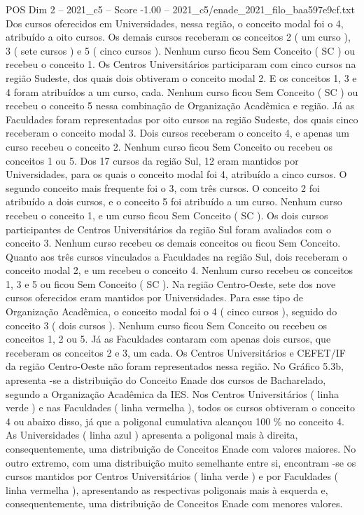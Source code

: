 \begin{textsample}{POS Dim 2 – 2021\_c5 – Score -1.00 – 2021\_c5/enade\_2021\_filo\_baa597e9cf.txt}
Dos cursos oferecidos em Universidades, nessa região, o conceito modal foi o 4, atribuído a oito cursos.
Os demais cursos receberam os conceitos 2 ( um curso ), 3 ( sete cursos ) e 5 ( cinco cursos ).
Nenhum curso ficou Sem Conceito ( SC ) ou recebeu o conceito 1.
Os Centros Universitários participaram com cinco cursos na região Sudeste, dos quais dois obtiveram o conceito modal 2.
E os conceitos 1, 3 e 4 foram atribuídos a um curso, cada.
Nenhum curso ficou Sem Conceito ( SC ) ou recebeu o conceito 5 nessa combinação de Organização Acadêmica e região.
Já as Faculdades foram representadas por oito cursos na região Sudeste, dos quais cinco receberam o conceito modal 3.
Dois cursos receberam o conceito 4, e apenas um curso recebeu o conceito 2.
Nenhum curso ficou Sem Conceito ou recebeu os conceitos 1 ou 5.
Dos 17 cursos da região Sul, 12 eram mantidos por Universidades, para os quais o conceito modal foi 4, atribuído a cinco cursos.
O segundo conceito mais frequente foi o 3, com três cursos.
O conceito 2 foi atribuído a dois cursos, e o conceito 5 foi atribuído a um curso.
Nenhum curso recebeu o conceito 1, e um curso ficou Sem Conceito ( SC ).
Os dois cursos participantes de Centros Universitários da região Sul foram avaliados com o conceito 3.
Nenhum curso recebeu os demais conceitos ou ficou Sem Conceito.
Quanto aos três cursos vinculados a Faculdades na região Sul, dois receberam o conceito modal 2, e um recebeu o conceito 4.
Nenhum curso recebeu os conceitos 1, 3 e 5 ou ficou Sem Conceito ( SC ).
Na região Centro-Oeste, sete dos nove cursos oferecidos eram mantidos por Universidades.
Para esse tipo de Organização Acadêmica, o conceito modal foi o 4 ( cinco cursos ), seguido do conceito 3 ( dois cursos ).
Nenhum curso ficou Sem Conceito ou recebeu os conceitos 1, 2 ou 5.
Já as Faculdades contaram com apenas dois cursos, que receberam os conceitos 2 e 3, um cada.
Os Centros Universitários e CEFET/IF da região Centro-Oeste não foram representados nessa região.
No Gráfico 5.3b, apresenta -se a distribuição do Conceito Enade dos cursos de Bacharelado, segundo a Organização Acadêmica da IES.
Nos Centros Universitários ( linha verde ) e nas Faculdades ( linha vermelha ), todos os cursos obtiveram o conceito 4 ou abaixo disso, já que a poligonal cumulativa alcançou 100 \% no conceito 4.
As Universidades ( linha azul ) apresenta a poligonal mais à direita, consequentemente, uma distribuição de Conceitos Enade com valores maiores.
No outro extremo, com uma distribuição muito semelhante entre si, encontram -se os cursos mantidos por Centros Universitários ( linha verde ) e por Faculdades ( linha vermelha ), apresentando as respectivas poligonais mais à esquerda e, consequentemente, uma distribuição de Conceitos Enade com menores valores.

\end{textsample}
